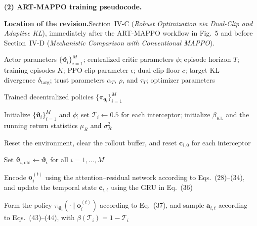 \documentclass[11pt]{article}
\newcommand{\loc}{\medskip\noindent\textbf{Location of the revision.}\quad}
\begin{document}
\medskip
\noindent\textbf{(2) ART-MAPPO training pseudocode.}

\loc Section~IV-C (\emph{Robust Optimization via Dual-Clip and Adaptive
KL}), immediately after the ART-MAPPO workflow in Fig.~5 and before
Section~IV-D (\emph{Mechanistic Comparison with Conventional MAPPO}).

\begin{tcolorbox}[enhanced,breakable,colback=white,colframe=addblue!55,
boxrule=0.6pt,arc=2pt,left=9pt,right=9pt,top=7pt,bottom=7pt]
\begin{algorithm}[H]
\color{addblue}
\fontsize{9pt}{11.0476pt}\selectfont
{}
\caption{ART-MAPPO for Cooperative Swarm Interception}
\begin{algorithmic}[1]

\REQUIRE Actor parameters
$\{\boldsymbol{\vartheta}_i\}_{i=1}^{M}$;
centralized critic parameters $\phi$; episode horizon $T$;
training episodes $K$; PPO clip parameter $\epsilon$;
dual-clip floor $c$; target KL divergence $\delta_{\mathrm{targ}}$;
trust parameters $\alpha_T$, $\rho$, and $\tau_T$;
optimizer parameters

\ENSURE Trained decentralized policies
$\{\pi_{\boldsymbol{\vartheta}_i}\}_{i=1}^{M}$

\STATE Initialize $\{\boldsymbol{\vartheta}_i\}_{i=1}^{M}$ and $\phi$;
set $\mathcal{T}_i\leftarrow0.5$ for each interceptor;
initialize $\beta_{\mathrm{KL}}$ and the running return statistics
$\mu_R$ and $\sigma_R^2$


  \STATE Reset the environment, clear the rollout buffer,
  and reset $\mathbf{c}_{i,0}$ for each interceptor

  \STATE Set
  $\boldsymbol{\vartheta}_{i,\mathrm{old}}
  \leftarrow\boldsymbol{\vartheta}_i$
  for all $i=1,\ldots,M$




      \STATE Encode $\mathbf{o}_i^{(t)}$ using the attention--residual
      network according to Eqs.~(28)--(34), and update the temporal state
      $\mathbf{c}_{i,t}$ using the GRU in Eq.~(36)

      \STATE Form the policy
      $\pi_{\boldsymbol{\vartheta}_i}
      (\cdot\mid\mathbf{o}_i^{(t)})$
      according to Eq.~(37), and sample $\mathbf{a}_{i,t}$
      according to Eqs.~(43)--(44), with
      $\beta(\mathcal{T}_i)=1-\mathcal{T}_i$


\end{algorithmic}
\end{algorithm}
\end{tcolorbox}
\end{document}
